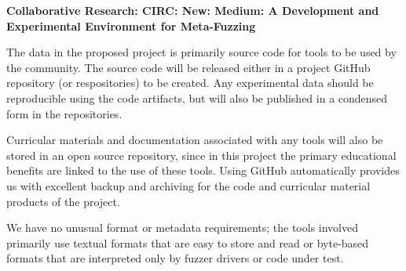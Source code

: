 \documentclass[12pt]{article}
\begin{document}

\begin{center}
  {\Large\sf\textbf{Collaborative Research: CIRC: New: Medium: A Development 
and Experimental Environment for Meta-Fuzzing}}
\end{center}

The data in the proposed project is primarily source code for tools to
be used by the community. The
source code will be released either in a project GitHub repository (or
respositories) to be created. Any experimental data should be reproducible 
using the code artifacts, but will also be published in a condensed form in the 
repositories.

Curricular
materials and documentation associated with any tools will also be stored in
an open source repository, since in this project the primary
educational benefits are linked to the use of these tools.  Using GitHub 
automatically provides us with excellent backup
and archiving for the code and curricular material products of the
project.

We have no unusual format or metadata requirements; the
tools involved primarily use textual formats that are easy to store
and read or byte-based formats that are interpreted only by fuzzer
drivers or code under test.
\end{document}
